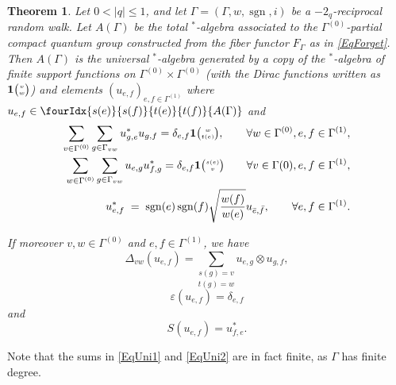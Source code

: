 \documentclass[10pt]{article}
\DeclareMathOperator{\sgn}{\mathrm{sgn}}
\newcommand{\Grt}[3]{#1{\tiny {\begin{pmatrix} #2\\#3\end{pmatrix}}}}
\newcommand{\UnitC}[2]{\Grt{\mathbf{1}}{#1}{#2}}
\newcommand{\Grru}[2]{{\tiny \begin{pmatrix} #1 \\ #2\end{pmatrix}}}
\newcommand{\Gr}[5]{\fourIdx{#2}{#4}{#3}{#5}{#1}}%
\newtheorem{Theorem}{Theorem}[section]
\theoremstyle{definition}
\numberwithin{equation}{section}
\begin{document}
\begin{Theorem}\label{TheoGenRel} Let $0<|q|\leq 1$, and let $\Gamma = (\Gamma,w,\sgn,i)$ be a $-2_q$-reciprocal random walk. Let $A(\Gamma)$ be the total $^*$-algebra associated to the $\Gamma^{(0)}$-partial compact quantum group constructed from the fiber functor $F_{\Gamma}$ as in \eqref{EqForget}. Then $A(\Gamma)$ is the universal $^*$-algebra generated by a copy of the $^*$-algebra of finite support functions on $\Gamma^{(0)}\times \Gamma^{(0)}$ (with the Dirac functions written as $\UnitC{v}{w}$) and elements $(u_{e,f})_{e,f\in \Gamma^{(1)}}$ where $u_{e,f}\in \Gr{A(\Gamma)}{s(e)}{t(e)}{s(f)}{t(f)}$ and 
\begin{eqnarray} 
\label{EqUni1}\sum_{v\in \Gamma^{(0)}}\sum_{g\in \Gamma_{vw}} u_{g,e}^*u_{g,f} = \delta_{e,f}\mathbf{1}\Grru{w}{t(e)}, \qquad \forall w\in \Gamma^{(0)}, e,f\in \Gamma^{(1)},\\ %
\label{EqUni2}\sum_{w\in \Gamma^{(0)}} \sum_{g\in \Gamma_{vw}} u_{e,g}u_{f,g}^* = \delta_{e,f} \mathbf{1}\Grru{s(e)}{v}\qquad \forall v\in \Gamma{(0)}, e,f\in \Gamma^{(1)},\\ 
\label{EqInt}u_{e,f}^* \;=\; \sgn(e)\sgn(f)\sqrt{\frac{w(f)}{w(e)}} u_{\bar{e},\bar{f}},\qquad \forall e,f\in \Gamma^{(1)}.
\end{eqnarray}

If moreover $v,w\in \Gamma^{(0)}$ and $e,f\in \Gamma^{(1)}$, we have \[\Delta_{vw}(u_{e,f}) = \underset{t(g) = w}{\sum_{s(g) = v}} u_{e,g}\otimes u_{g,f},\]
\[\varepsilon(u_{e,f}) = \delta_{e,f}\] and \[S(u_{e,f}) = u_{f,e}^*.\] 
\end{Theorem} 

Note that the sums in \eqref{EqUni1} and \eqref{EqUni2} are in fact finite, as $\Gamma$ has finite degree. 
\end{document}
